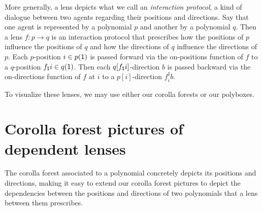 \documentclass[Book-Poly]{subfiles}
\begin{document}

More generally, a lens depicts what we call an \emph{interaction protocol}, a kind of dialogue between two agents regarding their positions and directions.
Say that one agent is represented by a polynomial $p$ and another by a polynomial $q$.
Then a lens $f\colon p\to q$ is an interaction protocol that prescribes how the positions of $p$ influence the positions of $q$ and how the directions of $q$ influence the directions of $p$.
Each $p$-position $i\in p(\textsf{1})$ is passed forward via the on-positions function of $f$ to a $q$-position $f_{\textsf{1}}i\in q(\textsf{1})$.
Then each $q[f_{\textsf{1}}i]$-direction $b$ is passed backward via the on-directions function of $f$ at $i$ to a $p[i]$-direction $f^\sharp_ib$.

To visualize these lenses, we may use either our corolla forests or our polyboxes.


\section{Corolla forest pictures of dependent lenses}

The corolla forest associated to a polynomial concretely depicts its positions and directions, making it easy to extend our corolla forest pictures to depict the dependencies between the positions and directions of two polynomials that a lens between them prescribes.

\end{document}
